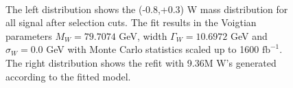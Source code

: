 \begin{figure}
\begin{minipage}{0.49\textwidth}
     \end{minipage}\\
     \caption{ The left distribution shows the (-0.8,+0.3) W mass distribution for all signal after selection cuts. The fit results in the Voigtian parameters $M_W = 79.7074$ GeV, width $\Gamma_W = 10.6972$ GeV and $\sigma_W = 0.0$ GeV with Monte Carlo statistics scaled up to 1600 $\text{fb}^{-1}$. The right distribution shows the refit with 9.36M W's generated according to the fitted model.}
\label{fig:badfit}


\end{figure}


